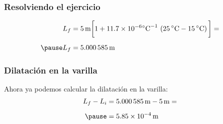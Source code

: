 \documentclass[14pt]{beamer}
\begin{document}
\begin{frame}
\frametitle{Resolviendo el ejercicio}
\begin{eqnarray*}
\begin{aligned}
L_{f} &= \SI{5}{\meter} \bigg[ 1 + \num{11.7d-6} \unit{\degreeCelsius}^{-1} \, \left( \SI{25}{\degreeCelsius} - \SI{15}{\degreeCelsius} \right) \bigg] = \\[0.5em] \pause
L_{f} &= \SI{5.000585}{\meter}
\end{aligned}
\end{eqnarray*}
\end{frame}
\begin{frame}
\frametitle{Dilatación en la varilla}
Ahora ya podemos calcular la dilatación en la varilla:
\pause
\begin{eqnarray*}
\begin{aligned}
L_{f} - L_{i} &= \SI{5.000585}{\meter} - \SI{5}{\meter} = \\[0.5em] \pause
&= \SI{5.85d-4}{\meter}
\end{aligned}
\end{eqnarray*}
\end{frame}
    
\end{document}
